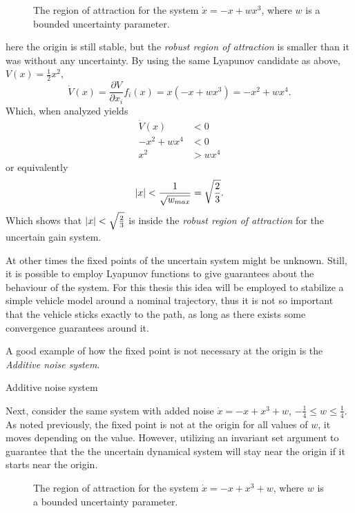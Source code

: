 \begin{figure}
  \centering
  
  \caption{The region of attraction for the system \(\dot{x} = -x + wx^3\),
    where \(w\) is a bounded uncertainty parameter.}
\end{figure}

here the origin is still stable, but the \textit{robust region of attraction} is
smaller than it was without any uncertainty. By using the same Lyapunov
candidate as above, \(V(x) = \frac{1}{2}x^2\),
\[
  \dot{V}(x) = \frac{\partial V}{\partial x_i} f_i(x) = x(-x + wx^3) = -x^2 +
  wx^4.
\]
Which, when analyzed yields
\begin{align*}
  \dot{V}(x) &< 0 \\
  -x^2 + wx^4 &< 0 \\
  x^2 &> wx^4
\end{align*}
or equivalently
\[
  \lvert x\rvert < \frac{1}{\sqrt{w_{max}}} = \sqrt{\frac{2}{3}}.
\]
Which shows that \(\lvert x\rvert < \sqrt{\frac{2}{3}}\) is inside the \textit{robust
  region of attraction} for the uncertain gain system.

At other times the fixed points of the uncertain system might be unknown. Still,
it is possible to employ Lyapunov functions to give guarantees about the
behaviour of the system. For this thesis this idea will be employed to stabilize
a simple vehicle model around a nominal trajectory, thus it is not so important
that the vehicle sticks exactly to the path, as long as there exists some
convergence guarantees around it.

A good example of how the fixed point is not necessary at the origin is the
\textit{Additive noise system}.

\begin{example}{Additive noise system}

  Next, consider the same system with added noise \(\dot{x} = -x + x^3 + w\),
  \(-\frac{1}{4} \leq w \leq \frac{1}{4}\). As noted previously, the fixed point
  is not at the origin for all values of \(w\), it moves depending on the value.
  However, utilizing an invariant set argument to guarantee that the the
  uncertain dynamical system will stay near the origin if it starts near the
  origin.
\end{example}


\begin{figure}
  \centering
  
  \caption{The region of attraction for the system \(\dot{x} = -x + x^3 + w\),
    where \(w\) is a bounded uncertainty parameter.}
\end{figure}

